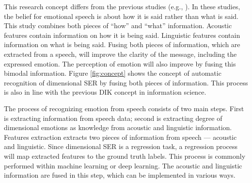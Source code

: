 This research concept differs from the previous studies (e.g., \cite{Li2019b,
Vayrynen2014}). In these studies, the belief for emotional speech is about how
it is said rather than what is said. This study combines both pieces of ``how''
and ``what'' information. Acoustic features contain information on how it is
being said.  Linguistic features contain information on what is being said.
Fusing both pieces of information, which are extracted from a speech, will
improve the clarity of the message, including the expressed emotion. The
perception of emotion will also improve by fusing this bimodal information.
Figure \ref{fig:concept} shows the concept of automatic recognition of
dimensional SER by fusing both pieces of information. This process is also in
line with the previous DIK concept in information science.

The process of recognizing emotion from speech consists of two main steps.
First is extracting information from speech data; second is extracting degree
of dimensional emotions as knowledge from acoustic and linguistic information.
Features extraction extracts two pieces of information from speech --- acoustic
and linguistic. Since dimensional SER is a regression task, a regression
process will map extracted features to the ground truth labels. This process is
commonly performed within machine learning or deep learning. The acoustic and
linguistic information are fused in this step, which can be implemented in
various ways.

